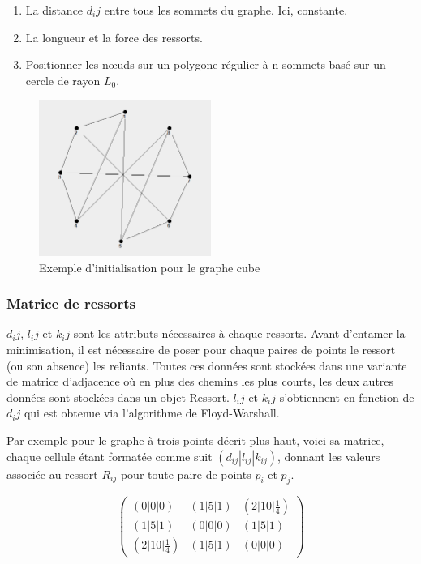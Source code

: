 \documentclass[a4paper,12pt]{article}
\begin{document}
\begin{enumerate}
  \item La distance $d_ij$ entre tous les sommets du graphe. Ici, constante.
  \item La longueur et la force des ressorts.
  \item Positionner les nœuds sur un polygone régulier à n sommets basé sur un cercle de rayon $L_0$.
\end{enumerate}

\begin {figure}[H]
    \centering
    \includegraphics[width=0.5\textwidth]{cube.png}
    \caption{Exemple d'initialisation pour le graphe cube}
\end {figure}

\subsubsection{Matrice de ressorts}

$d_ij$, $l_ij $ et $k_ij$ sont les attributs nécessaires à chaque ressorts. Avant d'entamer la minimisation, il est nécessaire de poser pour chaque paires de points le ressort (ou son absence) les reliants. Toutes ces données sont stockées dans une variante de matrice d'adjacence où en plus des chemins les plus courts, les deux autres données sont stockées dans un objet Ressort. $l_ij $ et $k_ij$ s'obtiennent en fonction de $d_ij$ qui est obtenue via l'algorithme de Floyd-Warshall.


Par exemple pour le graphe à trois points décrit plus haut, voici sa matrice, chaque cellule étant formatée comme suit $(d_{ij} | l_{ij} | k_{ij})$, donnant les valeurs associée au ressort $R_{ij}$ pour toute paire de points $p_i$ et $p_j$. 

$$
\begin{pmatrix}
  (0|0|0) & (1|5|1) & (2|10|\frac{1}{4}) \\
  (1|5|1) & (0|0|0) & (1|5|1) \\
  (2|10|\frac{1}{4}) & (1|5|1) & (0|0|0)
\end{pmatrix}
$$
\end{document}
